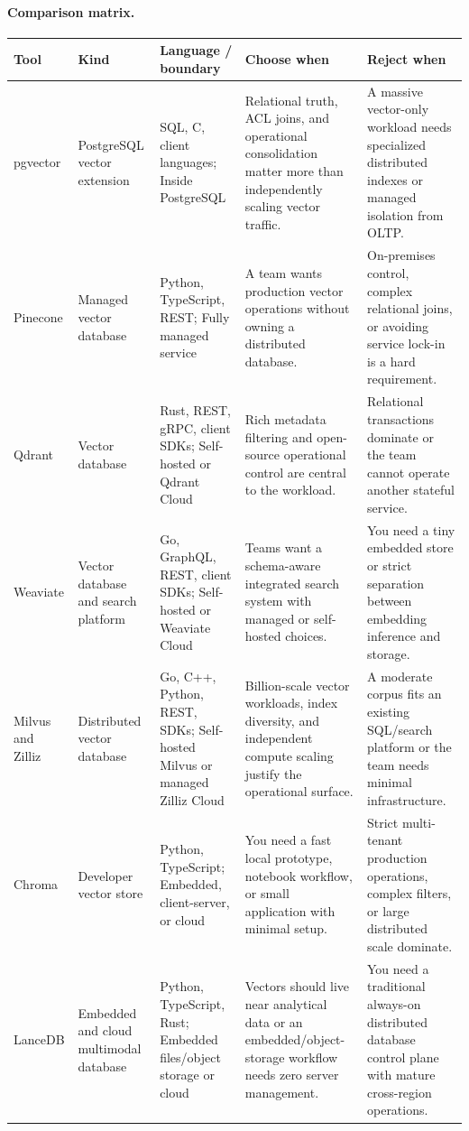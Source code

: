 \paragraph{Comparison matrix.}
\begin{longtable}{@{}p{20mm}p{22mm}p{26mm}p{46mm}p{46mm}@{}}
\toprule\textbf{Tool} & \textbf{Kind} & \textbf{Language / boundary} & \textbf{Choose when} & \textbf{Reject when}\\\midrule\endhead
pgvector & PostgreSQL vector extension & SQL, C, client languages; Inside PostgreSQL & Relational truth, ACL joins, and operational consolidation matter more than independently scaling vector traffic. & A massive vector-only workload needs specialized distributed indexes or managed isolation from OLTP.\\
Pinecone & Managed vector database & Python, TypeScript, REST; Fully managed service & A team wants production vector operations without owning a distributed database. & On-premises control, complex relational joins, or avoiding service lock-in is a hard requirement.\\
Qdrant & Vector database & Rust, REST, gRPC, client SDKs; Self-hosted or Qdrant Cloud & Rich metadata filtering and open-source operational control are central to the workload. & Relational transactions dominate or the team cannot operate another stateful service.\\
Weaviate & Vector database and search platform & Go, GraphQL, REST, client SDKs; Self-hosted or Weaviate Cloud & Teams want a schema-aware integrated search system with managed or self-hosted choices. & You need a tiny embedded store or strict separation between embedding inference and storage.\\
Milvus and Zilliz & Distributed vector database & Go, C++, Python, REST, SDKs; Self-hosted Milvus or managed Zilliz Cloud & Billion-scale vector workloads, index diversity, and independent compute scaling justify the operational surface. & A moderate corpus fits an existing SQL/search platform or the team needs minimal infrastructure.\\
Chroma & Developer vector store & Python, TypeScript; Embedded, client-server, or cloud & You need a fast local prototype, notebook workflow, or small application with minimal setup. & Strict multi-tenant production operations, complex filters, or large distributed scale dominate.\\
LanceDB & Embedded and cloud multimodal database & Python, TypeScript, Rust; Embedded files/object storage or cloud & Vectors should live near analytical data or an embedded/object-storage workflow needs zero server management. & You need a traditional always-on distributed database control plane with mature cross-region operations.\\

\end{longtable}
